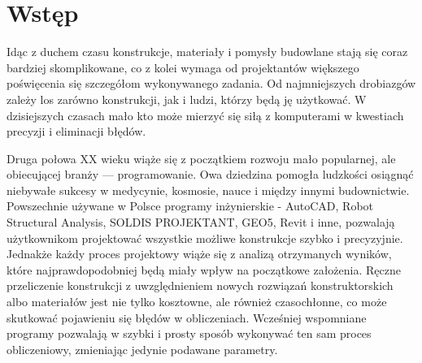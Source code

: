 \newpage
{}
\section*{Wstęp}

Idąc z duchem czasu konstrukcje, materiały i pomysły budowlane stają się coraz bardziej skomplikowane, co z kolei wymaga
od projektantów większego poświęcenia się szczegółom wykonywanego zadania. Od najmniejszych drobiazgów zależy los zarówno konstrukcji, jak i ludzi,
którzy będą ję użytkować. W dzisiejszych czasach mało kto może mierzyć się siłą z komputerami w kwestiach precyzji
i eliminacji błędów.

\par Druga połowa XX wieku wiąże się z początkiem rozwoju mało popularnej, ale obiecującej branży — programowanie.
Owa dziedzina pomogła ludzkości osiągnąć niebywałe sukcesy w medycynie, kosmosie, nauce i między innymi budownictwie.
Powszechnie używane w Polsce programy inżynierskie - AutoCAD, Robot Structural Analysis, SOLDIS PROJEKTANT, GEO5, Revit i inne,
pozwalają użytkownikom projektować wszystkie możliwe konstrukcje szybko i precyzyjnie. Jednakże każdy proces projektowy wiąże się z
analizą otrzymanych wyników, które najprawdopodobniej będą miały wpływ na początkowe założenia. Ręczne przeliczenie konstrukcji z
uwzględnieniem nowych rozwiązań konstruktorskich albo materiałów jest nie tylko kosztowne, ale również czasochłonne, co może skutkować
pojawieniu się błędów w obliczeniach. Wcześniej wspomniane programy pozwalają w szybki i prosty sposób wykonywać ten sam
proces obliczeniowy, zmieniając jedynie podawane parametry.
